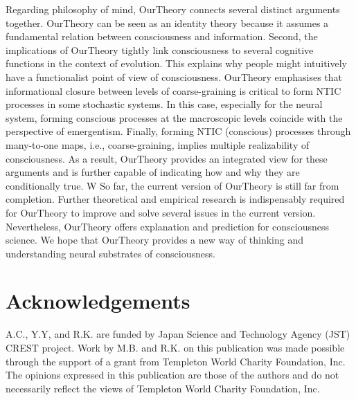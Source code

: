 \documentclass[utf8]{article}
\begin{document}
	
	Regarding philosophy of mind, \ac{OurTheory} connects several distinct arguments together. \ac{OurTheory} can be seen as an identity theory because it assumes a fundamental relation between consciousness and information. Second, the implications of \ac{OurTheory} tightly link consciousness to several cognitive functions in the context of evolution. This explains why people might intuitively have a functionalist point of view of consciousness. \ac{OurTheory} emphasises that informational closure between levels of coarse-graining is critical to form NTIC processes in some stochastic systems. In this case, especially for the neural system, forming conscious processes at the macroscopic levels coincide with the perspective of emergentism. Finally, forming NTIC (conscious) processes through many-to-one maps, i.e., coarse-graining, implies multiple realizability of consciousness. As a result, \ac{OurTheory} provides an integrated view for these arguments and is further capable of indicating how and why they are conditionally true.
W
	So far, the current version of \ac{OurTheory} is still far from completion. Further theoretical and empirical research is indispensably required for \ac{OurTheory} to improve and solve several issues in the current version. Nevertheless, \ac{OurTheory} offers explanation and prediction for consciousness science. We hope that \ac{OurTheory} provides a new way of thinking and understanding neural substrates of consciousness.  
	
	\section*{Acknowledgements}
	A.C., Y.Y, and R.K. are funded by Japan Science and Technology Agency (JST) CREST project. Work by M.B. and R.K. on this publication was made possible through the support of a grant from Templeton World Charity Foundation, Inc. The opinions expressed in this publication are those of the authors and do not necessarily reflect the views of Templeton World Charity Foundation, Inc.

	
	
\end{document}
